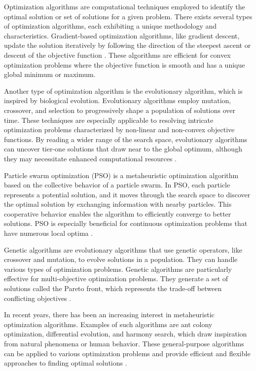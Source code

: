 Optimization algorithms are computational techniques employed to identify the optimal solution or set of solutions for a given problem. There exists several types of optimization algorithms, each exhibiting a unique methodology and characteristics.   Gradient-based optimization algorithms, like gradient descent, update the solution iteratively by following the direction of the steepest ascent or descent of the objective function \cite{Ruder.2017}. These algorithms are efficient for convex optimization problems where the objective function is smooth and has a unique global minimum or maximum.

Another type of optimization algorithm is the evolutionary algorithm, which is inspired by biological evolution. Evolutionary algorithms employ mutation, crossover, and selection to progressively shape a population of solutions over time. These techniques are especially applicable to resolving intricate optimization problems characterized by non-linear and non-convex objective functions. By reading a wider range of the search space, evolutionary algorithms can uncover tier-one solutions that draw near to the global optimum, although they may necessitate enhanced computational resources \cite{Back.1993}.

Particle swarm optimization (PSO) is a metaheuristic optimization algorithm based on the collective behavior of a particle swarm. In PSO, each particle represents a potential solution, and it moves through the search space to discover the optimal solution by exchanging information with nearby particles. This cooperative behavior enables the algorithm to efficiently converge to better solutions. PSO is especially beneficial for continuous optimization problems that have numerous local optima \cite{Back.1993}.

Genetic algorithms are evolutionary algorithms that use genetic operators, like crossover and mutation, to evolve solutions in a population. They can handle various types of optimization problems. Genetic algorithms are particularly effective for multi-objective optimization problems. They generate a set of solutions called the Pareto front, which represents the trade-off between conflicting objectives \cite{Lambora.2019,Katoch.2021}.

In recent years, there has been an increasing interest in metaheuristic optimization algorithms. Examples of such algorithms are ant colony optimization, differential evolution, and harmony search, which draw inspiration from natural phenomena or human behavior. These general-purpose algorithms can be applied to various optimization problems and provide efficient and flexible approaches to finding optimal solutions \cite{Yang.2011}.

